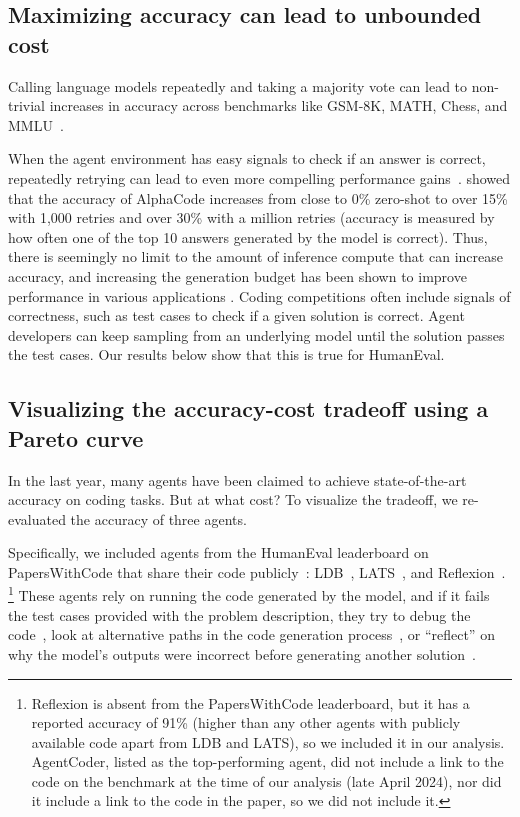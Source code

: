 \documentclass{article}
\begin{document}
\subsection{Maximizing accuracy can lead to unbounded cost}

Calling language models repeatedly and taking a majority vote can lead to non-trivial increases in accuracy across benchmarks like GSM-8K, MATH, Chess, and MMLU~\citep{li_more_2024,chen_are_2024, sun_easy--hard_2024}. 

When the agent environment has easy signals to check if an answer is correct, repeatedly retrying can lead to even more compelling performance gains~\citep{villalobos_trading_2023}. \citet{li_competition-level_2022} showed that the accuracy of AlphaCode increases from close to 0\% zero-shot to over 15\% with 1,000 retries and over 30\% with a million retries (accuracy is measured by how often one of the top 10 answers generated by the model is correct). Thus, there is seemingly no limit to the amount of inference compute that can increase accuracy, and increasing the generation budget has been shown to improve performance in various applications \citep{welleck_decoding_2024}. Coding competitions often include signals of correctness, such as test cases to check if a given solution is correct. Agent developers can keep sampling from an underlying model until the solution passes the test cases. Our results below show that this is true for HumanEval.


\subsection{Visualizing the accuracy-cost tradeoff using a Pareto curve}

In the last year, many agents have been claimed to achieve state-of-the-art accuracy on coding tasks. But at what cost? To visualize the tradeoff, we re-evaluated the accuracy of three agents.


Specifically, we included agents from the HumanEval leaderboard on PapersWithCode that share their code publicly~\citep{chen_evaluating_2021}: LDB~\citep{zhong_ldb_2024}, LATS~\citep{zhou_language_2023}, and Reflexion~\citep{shinn_reflexion_2023}. \footnote{Reflexion is absent from the PapersWithCode leaderboard, but it has a reported accuracy of 91\% (higher than any other agents with publicly available code apart from LDB and LATS), so we included it in our analysis. AgentCoder,  listed as the top-performing agent, did not include a link to the code on the benchmark at the time of our analysis (late April 2024), nor did it include a link to the code in the paper, so we did not include it. 
} 
These agents rely on running the code generated by the model, and if it fails the test cases provided with the problem description, they try to debug the code~\citep{zhong_ldb_2024}, look at alternative paths in the code generation process~\citep{zhou_language_2023}, or ``reflect'' on why the model's outputs were incorrect before generating another solution~\citep{shinn_reflexion_2023, zhou_language_2023, zhong_ldb_2024}. 
\end{document}
